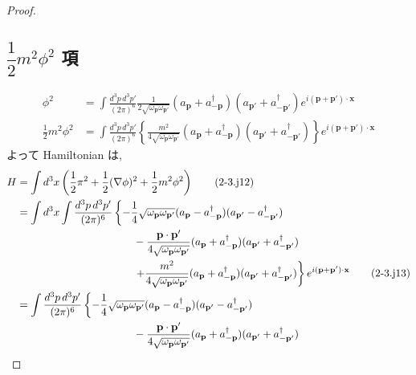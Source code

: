 \documentclass[a4paper,12pt]{article}
\begin{document}
\begin{proof}
\subsection*{$\dfrac{1}{2} m^2 \phi^2$ 項}
\begin{align*}
    \phi^2 &= \int \frac{d^3 p \, d^3 p'}{(2\pi)^6} \frac{1}{2\sqrt{\omega_{\mathbf{p}}\omega_{\mathbf{p}'}}} \left( a_{\mathbf{p}}  + a^\dagger_{-\mathbf{p}} \right) \left( a_{\mathbf{p}'}  + a^\dagger_{-\mathbf{p}'} \right) e^{i(\mathbf{p}+\mathbf{p}')\cdot\mathbf{x}} \tag{2-3.j10}\\
    \frac{1}{2} m^2 \phi^2 &= \int \frac{d^3 p \, d^3 p'}{(2\pi)^6} \left\{\frac{m^2}{4\sqrt{\omega_{\mathbf{p}}\omega_{\mathbf{p}'}}} \left( a_{\mathbf{p}}  + a^\dagger_{-\mathbf{p}} \right) \left( a_{\mathbf{p}'}  + a^\dagger_{-\mathbf{p}'} \right)\right\} e^{i(\mathbf{p}+\mathbf{p}')\cdot\mathbf{x}} \tag{2-3.j11}
\end{align*}
よって Hamiltonian は,
\begin{align*}
    H &= \int d^3x \left( \frac{1}{2} \pi^2 + \frac{1}{2} (\nabla \phi)^2 + \frac{1}{2} m^2 \phi^2 \right) \tag{2-3.j12}\\
    &= \int d^3x \int \frac{d^3 p \, d^3 p'}{(2\pi)^6} \left\{-\frac{1}{4} \sqrt{\omega_{\mathbf{p}}\omega_{\mathbf{p}'}} (a_{\mathbf{p}} - a^\dagger_{-\mathbf{p}})(a_{\mathbf{p}'} - a^\dagger_{-\mathbf{p}'}) \right. \\
    &\quad \hspace{3.5cm} - \frac{\mathbf{p}\cdot\mathbf{p}'}{4\sqrt{\omega_{\mathbf{p}}\omega_{\mathbf{p}'}}} (a_{\mathbf{p}} + a^\dagger_{-\mathbf{p}})(a_{\mathbf{p}'} + a^\dagger_{-\mathbf{p}'}) \\
    &\quad \hspace{3.5cm} \left. + \frac{m^2}{4\sqrt{\omega_{\mathbf{p}}\omega_{\mathbf{p}'}}} (a_{\mathbf{p}} + a^\dagger_{-\mathbf{p}})(a_{\mathbf{p}'} + a^\dagger_{-\mathbf{p}'})\right\} e^{i(\mathbf{p}+\mathbf{p}')\cdot\mathbf{x}} \tag{2-3.j13}\\
    &= \int \frac{d^3 p \, d^3 p'}{(2\pi)^6} \left\{-\frac{1}{4} \sqrt{\omega_{\mathbf{p}}\omega_{\mathbf{p}'}} (a_{\mathbf{p}} - a^\dagger_{-\mathbf{p}})(a_{\mathbf{p}'} - a^\dagger_{-\mathbf{p}'}) \right. \\
    &\quad \hspace{3.5cm} - \frac{\mathbf{p}\cdot\mathbf{p}'}{4\sqrt{\omega_{\mathbf{p}}\omega_{\mathbf{p}'}}} (a_{\mathbf{p}} + a^\dagger_{-\mathbf{p}})(a_{\mathbf{p}'} + a^\dagger_{-\mathbf{p}'}) \\

\end{align*}
\end{proof}
\end{document}
